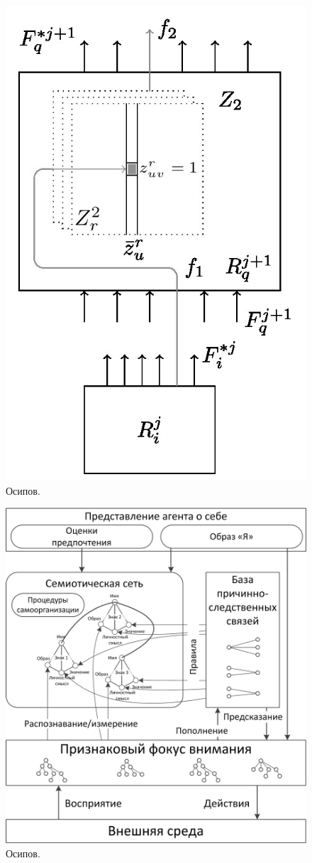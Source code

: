 \documentclass[a4paper, 12pt]{article}
\theoremstyle{break}
\numberwithin{equation}{section}
\begin{document}
	\begin{figure}[p]
		\centering
		\includegraphics[width=0.3\linewidth]{automata/meas.jpg}
		\caption{Осипов.}
		\label{fig:auto_measur}
	\end{figure}
	
	\begin{figure}[p]
		\centering
		\includegraphics[width=0.7\linewidth]{iagent.jpg}
		\caption{Осипов.}
		\label{fig:iagent}
	\end{figure}		
\end{document}
